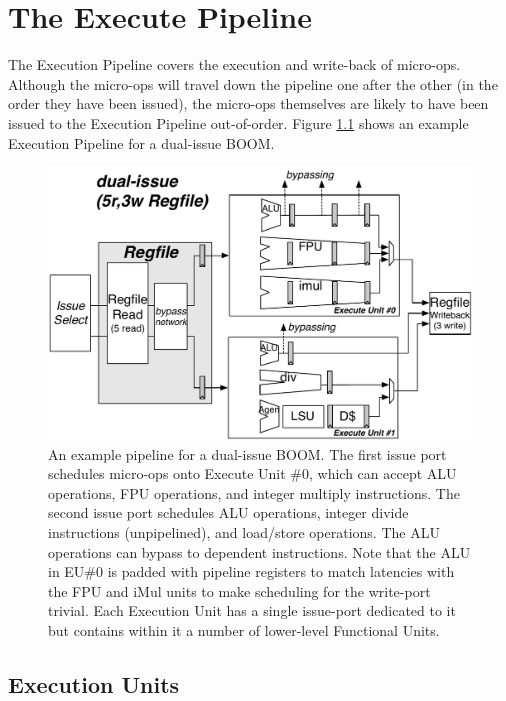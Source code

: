 \chapter{The Execute Pipeline}\label{chapter:execute}


The Execution Pipeline covers the execution and write-back of micro-ops.  Although the micro-ops will travel down the pipeline one after the other (in the order they have been issued), the micro-ops themselves are likely to have been issued to the Execution Pipeline out-of-order. Figure \ref{fig:execute-pipeline} shows an example Execution Pipeline for a dual-issue BOOM. 

\begin{figure}[htbp]
	\centering
	\centerline{\includegraphics[scale =0.75] {figures/execution-pipeline-2w}}
	\caption{ \small An example pipeline for a dual-issue BOOM. The first issue port schedules micro-ops onto Execute Unit \#0, which can accept ALU operations, FPU operations, and integer multiply instructions.  The second issue port schedules ALU operations, integer divide instructions (unpipelined), and load/store operations.  The ALU operations can bypass to dependent instructions.  Note that the ALU in EU\#0 is padded with pipeline registers to match latencies with the FPU and iMul units to make scheduling for the write-port trivial. Each Execution Unit has a single issue-port dedicated to it but contains within it a number of lower-level Functional Units.}
	\label{fig:execute-pipeline}
\end{figure}



\section{Execution Units}


